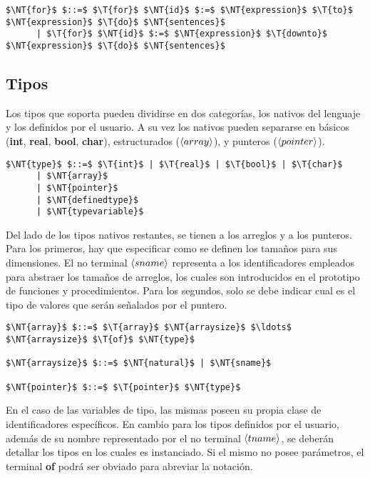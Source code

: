 \begin{lstlisting}[style = syntax]
$\NT{for}$ $::=$ $\T{for}$ $\NT{id}$ $:=$ $\NT{expression}$ $\T{to}$ $\NT{expression}$ $\T{do}$ $\NT{sentences}$
      | $\T{for}$ $\NT{id}$ $:=$ $\NT{expression}$ $\T{downto}$ $\NT{expression}$ $\T{do}$ $\NT{sentences}$
\end{lstlisting}

\subsection{Tipos}

Los tipos que soporta \Lenguaje{} pueden dividirse en dos categorías, los nativos del lenguaje y los definidos por el usuario.
A su vez los nativos pueden separarse en básicos (\textbf{int}, \textbf{real}, \textbf{bool}, \textbf{char}), estructurados ($\langle array \rangle$), y punteros ($\langle pointer \rangle$).

\begin{lstlisting}[style = syntax]
$\NT{type}$ $::=$ $\T{int}$ | $\T{real}$ | $\T{bool}$ | $\T{char}$
      | $\NT{array}$
      | $\NT{pointer}$
      | $\NT{definedtype}$
      | $\NT{typevariable}$
\end{lstlisting}

Del lado de los tipos nativos restantes, se tienen a los arreglos y a los punteros.
Para los primeros, hay que especificar como se definen los tamaños para sus dimensiones.
El no terminal $\langle sname \rangle$ representa a los identificadores empleados para abstraer los tamaños de arreglos, los cuales son introducidos en el prototipo de funciones y procedimientos.
Para los segundos, solo se debe indicar cual es el tipo de valores que serán señalados por el puntero.

\begin{lstlisting}[style = syntax]
$\NT{array}$ $::=$ $\T{array}$ $\NT{arraysize}$ $\ldots$ $\NT{arraysize}$ $\T{of}$ $\NT{type}$

$\NT{arraysize}$ $::=$ $\NT{natural}$ | $\NT{sname}$

$\NT{pointer}$ $::=$ $\T{pointer}$ $\NT{type}$
\end{lstlisting}

En el caso de las variables de tipo, las mismas poseen su propia clase de identificadores específicos.
En cambio para los tipos definidos por el usuario, además de su nombre representado por el no terminal $\langle tname \rangle$, se deberán detallar los tipos en los cuales es instanciado.
Si el mismo no posee parámetros, el terminal \textbf{of} podrá ser obviado para abreviar la notación.

